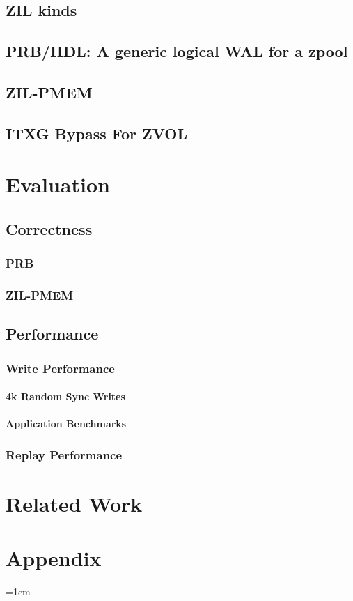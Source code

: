 \documentclass[12pt,a4paper,twoside,draft]{book}
\begin{document}
\section{ZIL kinds}
\section{PRB/HDL: A generic logical WAL for a zpool}
\section{ZIL-PMEM}
\section{ITXG Bypass For ZVOL}

\chapter{Evaluation}\label{ch:eval}
\section{Correctness}
\subsection{PRB}
\subsection{ZIL-PMEM}
\section{Performance}
\subsection{Write Performance}
\subsubsection{4k Random Sync Writes}
\subsubsection{Application Benchmarks}
\subsection{Replay Performance}

\chapter{Related Work}

\backmatter

\chapter{Appendix}\label{ch:appendix}

\cleardoublepage
{}
{}
\emergencystretch=1em
\printbibliography
\end{document}

